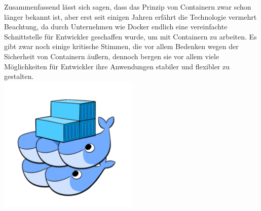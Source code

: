 \noindent Zusammenfassend lässt sich sagen, dass das Prinzip von Containern zwar schon länger bekannt ist, aber erst seit einigen Jahren erfährt die Technologie vermehrt Beachtung, da durch Unternehmen wie Docker endlich eine vereinfachte Schnittstelle für Entwickler geschaffen wurde, um mit Containern zu arbeiten. Es gibt zwar noch einige kritische Stimmen, die vor allem Bedenken wegen der Sicherheit von Containern äußern, dennoch bergen sie vor allem viele Möglichkeiten für Entwickler ihre Anwendungen stabiler und flexibler zu gestalten.\\

\centering
\includegraphics[width=0.5\textwidth]{images/14-docker-swarm-hero2.png}

